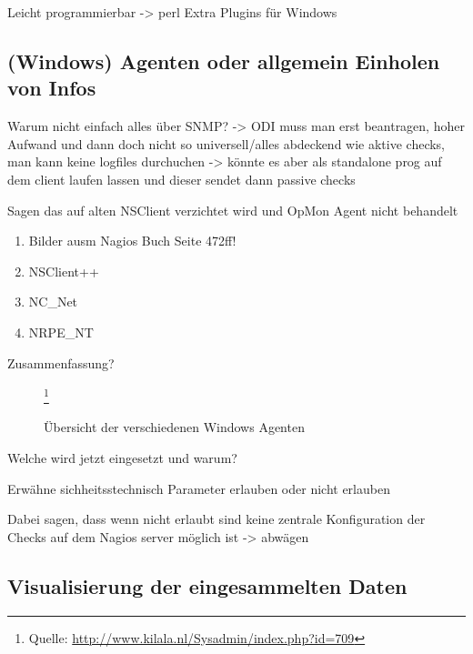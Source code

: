 Leicht programmierbar -> perl
Extra Plugins für Windows

\subsection{(Windows) Agenten oder allgemein Einholen von Infos}
Warum nicht einfach alles über SNMP? -> ODI muss man erst beantragen, hoher Aufwand und dann doch nicht so universell/alles abdeckend wie aktive checks, man kann keine logfiles durchuchen -> könnte es aber als standalone prog auf dem client laufen lassen und dieser sendet dann passive checks

Sagen das auf alten NSClient verzichtet wird und OpMon Agent nicht behandelt
\begin{enumerate}
\item Bilder ausm Nagios Buch Seite 472ff!
\item NSClient++
\item NC\_Net
\item NRPE\_NT
\end{enumerate}

Zusammenfassung?

\begin{figure}[ht]
	\centering
		\caption{Übersicht der verschiedenen Windows Agenten}\footnote{Quelle: \url{http://www.kilala.nl/Sysadmin/index.php?id=709}}
		\label{win-agents}
\end{figure}

Welche wird jetzt eingesetzt und warum?

Erwähne sichheitsstechnisch Parameter erlauben oder nicht erlauben

Dabei sagen, dass wenn nicht erlaubt sind keine zentrale Konfiguration der Checks auf dem Nagios server möglich ist -> abwägen

\subsection{Visualisierung der eingesammelten Daten}